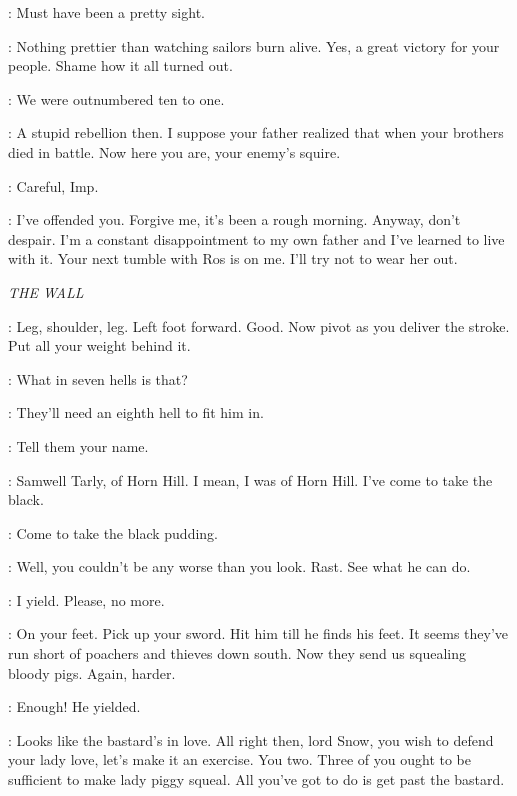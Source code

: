 \THEON: Must have been a pretty sight. 

\TYRION: Nothing prettier than watching sailors burn alive. Yes, a great victory for your people. Shame how it all turned out. 

\THEON: We were outnumbered ten to one. 

\TYRION: A stupid rebellion then. I suppose your father realized that when your brothers died in battle. Now here you are, your enemy's squire. 

\THEON: Careful, Imp. 

\TYRION: I've offended you. Forgive me, it's been a rough morning. Anyway, don't despair. I'm a constant disappointment to my own father and I've learned to live with it.  Your next tumble with Ros is on me. I'll try not to wear her out. 

\scene

\textit{THE WALL}


\JON: Leg, shoulder, leg. Left foot forward. Good. Now pivot as you deliver the stroke. Put all your weight behind it. 


\GRENN: What in seven hells is that? 

\PYP: They'll need an eighth hell to fit him in. 

\ALLISER: Tell them your name. 

\SAM: Samwell Tarly, of Horn Hill. I mean, I was of Horn Hill. I've come to take the black. 

\RAST: Come to take the black pudding. 

\ALLISER: Well, you couldn't be any worse than you look. Rast. See what he can do. 


\SAM: I yield. Please, no more. 

\ALLISER: On your feet. Pick up your sword.  Hit him till he finds his feet. It seems they've run short of poachers and thieves down south. Now they send us squealing bloody pigs. Again, harder. 


\JON: Enough! He yielded. 

\ALLISER: Looks like the bastard's in love. All right then, lord Snow, you wish to defend your lady love, let's make it an exercise. You two. Three of you ought to be sufficient to make lady piggy squeal. All you've got to do is get past the bastard. 

